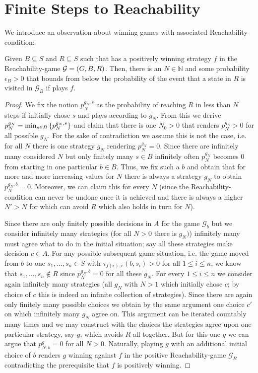 \section{Finite Steps to Reachability}
We introduce an observation about winning games with associated 
Reachability-condition:
\begin{proposition}
  Given $B\subseteq S$ and $R\subseteq S$ such that \eve{} has a positively
  winning strategy $f$ in the Reachability-game $\mathcal{G}=\left(G, B, R\right)$.
  Then, there is an $N\in\mathbb{N}$ and some probability $\epsilon_{B} > 0$ 
  that bounds from below the probability of the event that a state in $R$ is 
  visited in $\mathcal{G}_{B}$ if \eve{} plays $f$.
\end{proposition}
\begin{proof}
  We fix the notion $p_{N}^{g_{N}, s}$ as the probability of reaching $R$ in 
  less than $N$ steps if \adam{} initially chose $s$ and plays according to 
  $g_{N}$. From this we derive $p_{N}^{g_{N}} = 
  \min_{s\in B}\left\{p_{N}^{g_{N}, s}\right\}$ and claim that there is one 
  $N_{0} > 0$ that renders $p_{N}^{g_{N}} > 0$ for all possible $g_{N}$. For 
  the sake of contradiction we assume this is not the case, i.e. for all $N$ 
  there is one strategy $g_{N}$ rendering $p_{N}^{g_{N}} = 0$. Since there 
  are infinitely many considered $N$ but only finitely many $s\in B$ 
  infinitely often $p_{N}^{g_{N}}$ becomes $0$ from starting in one 
  particular $b\in B$. Thus, we fix such a $b$ and obtain that for more and 
  more increasing values for $N$ there is always a strategy $g_{N}$ to obtain 
  $p_{N}^{g_{N}, b} = 0$. Moreover, we can claim this for every $N$ (since 
  the Reachability-condition can never be undone once it is achieved and 
  there is always a higher $N' > N$ for which \adam{} can avoid $R$ which 
  also holds in turn for $N$).

  Since there are only finitely possible decisions in $A$ for the game 
  $\mathcal{G}_{b}$ but we consider infinitely many strategies (for all $N>0$ 
  there is $g_{N})$) infinitely many must agree what to do in the initial 
  situation; say all these strategies make decision $c\in A$. For any 
  possible subsequent game situation, i.e. the game moved from $b$ to 
  one $s_{1},\dots, s_{n}\in S$ with $\tau_{f(\epsilon), c}(b, s_{i}) > 0$ 
  for all $1\leq i\leq n$, we know that $s_{1},\dots, s_{n}\not\in R$ since
  $p_{N}^{g_{N}, b} = 0$ for all these $g_{N}$. For every $1\leq i\leq n$ we 
  consider again infinitely many strategies (all $g_{N}$ with $N>1$ which 
  initially chose $c$; by choice of $c$ this is indeed an infinite collection
  of strategies). Since there are again only finitely many possible choices 
  we obtain by the same argument one choice $c'$ on which infinitely many 
  $g_{N}$ agree on. This argument can be iterated countably many times and we 
  may construct with the choices the strategies agree upon one particular 
  strategy, say $g$, which avoids $R$ all together. But for this one $g$ we
  can argue that $p_{N, b}^{g} = 0$ for all $N>0$. Naturally, playing $g$ 
  with an additional initial choice of $b$ renders $g$ winning against $f$ in
  the positive Reachability-game $\mathcal{G}_{B}$ contradicting the 
  prerequisite that $f$ is positively winning.


\end{proof}
